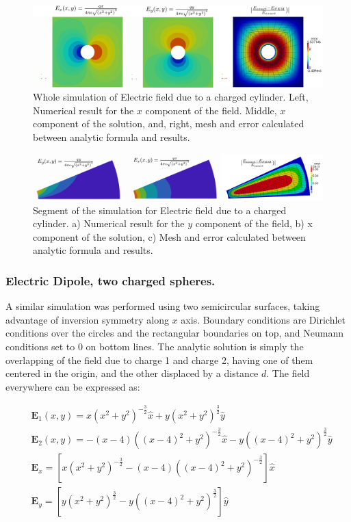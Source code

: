 \begin{figure}
\centering
\includegraphics[scale=0.2]{./img/charged_cylinder_inside_rectangle.pdf}
\caption{Whole simulation of Electric field due to a charged cylinder. Left, Numerical result for the $x$ component of the field. Middle, $x$ component of the solution, and, right, mesh and error calculated between analytic formula and results.}
\label{fig:whole_cylinder}
\end{figure}
 
\begin{figure}
\centering
\includegraphics[scale=0.2]{./img/Eight_of_cylinder.pdf}
\caption{Segment of the simulation for Electric field due to a charged cylinder. a) Numerical result for the $y$ component of the field, b) x component of the solution, c) Mesh and error calculated between analytic formula and results.}
\label{fig:eight_of_cylinder}
\end{figure}

\subsubsection{Electric Dipole, two charged spheres.}

A similar simulation was performed using two semicircular surfaces, taking advantage of inversion symmetry along $x$ axis. Boundary conditions are Dirichlet conditions over the circles and the rectangular boundaries on top, and Neumann conditions set to 0 on bottom lines.  The analytic solution is simply the overlapping of the field due to charge 1 and charge 2, having one of them centered in the origin, and the other displaced by a distance $d$. The field everywhere can be expressed as: 

\begin{align}
&\mathbf{E}_1(x,y)=x\left(x^2+y^2\right)^{-\frac{3}{2}}\hat{x} + y\left(x^2+y^2\right)^{\frac{3}{2}}\hat{y}\\ 
&\mathbf{E}_2(x,y)=-(x-4)\left((x-4)^2+y^2\right)^{-\frac{3}{2}} \hat{x}-y\left((x-4)^2+y^2\right)^{\frac{3}{2}}\hat{y}\\
&\mathbf{E}_x = \left[ x\left(x^2+y^2\right)^{-\frac{3}{2}} -(x-4)\left((x-4)^2+y^2\right)^{-\frac{3}{2}}\right] \hat{x}\\
&\mathbf{E}_y =\left[ y\left(x^2+y^2\right)^{\frac{3}{2}} -y\left((x-4)^2+y^2\right)^{\frac{3}{2}}\right]\hat{y}
\end{align}

